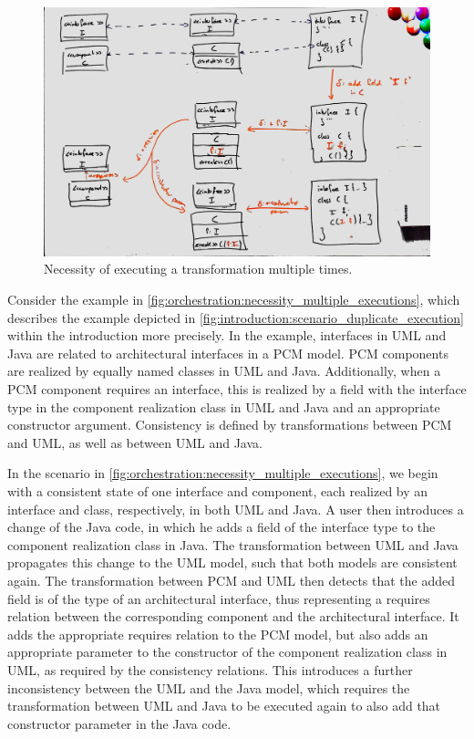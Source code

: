 \begin{figure}
    \centering
    \includegraphics[width=\textwidth]{figures/correctness/orchestration/necessity_multiple_executions.jpg}
    \caption[Necessity of executing a transformation multiple times]{Necessity of executing a transformation multiple times.}
    \label{fig:orchestration:necessity_multiple_executions}
\end{figure}

Consider the example in \autoref{fig:orchestration:necessity_multiple_executions}, which describes the example depicted in \autoref{fig:introduction:scenario_duplicate_execution} within the introduction more precisely.
In the example, interfaces in UML and Java are related to architectural interfaces in a \gls{PCM} model.
\gls{PCM} components are realized by equally named classes in UML and Java.
Additionally, when a \gls{PCM} component requires an interface, this is realized by a field with the interface type in the component realization class in UML and Java and an appropriate constructor argument.
Consistency is defined by transformations between \gls{PCM} and UML, as well as between UML and Java.

In the scenario in \autoref{fig:orchestration:necessity_multiple_executions}, we begin with a consistent state of one interface and component, each realized by an interface and class, respectively, in both UML and Java.
A user then introduces a change of the Java code, in which he adds a field of the interface type to the component realization class in Java.
The transformation between UML and Java propagates this change to the UML model, such that both models are consistent again.
The transformation between \gls{PCM} and UML then detects that the added field is of the type of an architectural interface, thus representing a requires relation between the corresponding component and the architectural interface. 
It adds the appropriate requires relation to the \gls{PCM} model, but also adds an appropriate parameter to the constructor of the component realization class in UML, as required by the consistency relations.
This introduces a further inconsistency between the UML and the Java model, which requires the transformation between UML and Java to be executed again to also add that constructor parameter in the Java code.

